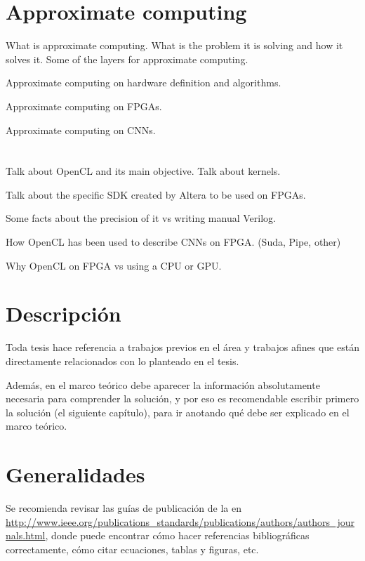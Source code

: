 
\section{Approximate computing}

What is approximate computing. What is the problem it is solving and
how it solves it. Some of the layers for approximate computing.

Approximate computing on hardware definition and algorithms.

Approximate computing on FPGAs.

Approximate computing on CNNs.

\section{\intelOCLnos}

Talk about OpenCL and its main objective. Talk about kernels.

Talk about the specific SDK created by Altera to be used on FPGAs.

Some facts about the precision of it vs writing manual Verilog.

How OpenCL has been used to describe CNNs on FPGA. (Suda, Pipe, other)

Why OpenCL on FPGA vs using a CPU or GPU.


\section{Descripción}

Toda tesis hace referencia a trabajos previos en el área y trabajos afines que
están directamente relacionados con lo planteado en el tesis.

Además, en el marco teórico debe aparecer la información absolutamente
necesaria para comprender la solución, y por eso es recomendable escribir
primero la solución (el siguiente capítulo), para ir anotando qué debe ser
explicado en el marco teórico.

\section{Generalidades}

Se recomienda revisar las guías de publicación de la  en
\url{http://www.ieee.org/publications_standards/publications/authors/authors_journals.html},
donde puede encontrar cómo hacer referencias bibliográficas correctamente, cómo
citar ecuaciones, tablas y figuras, etc.  

